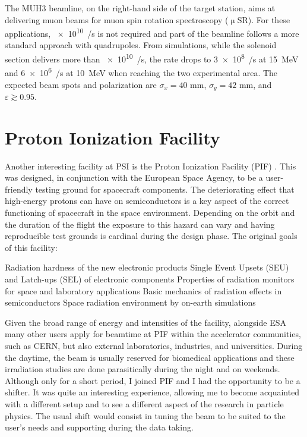 \begin{refsection}
        The MUH3 beamline, on the right-hand side of the target station, aims at delivering muon beams for muon spin rotation spectroscopy ($\upmu$SR).
        For these applications, \SI{e10}{\upmu/s} is not required and part of the beamline follows a more standard approach with quadrupoles.
        From simulations, while the solenoid section delivers more than \SI{e10}{\upmu/s}, the rate drops to \SI{3e8}{\upmu/s} at \SI{15}{MeV} and \SI{6e6}{\upmu/s} at \SI{10}{MeV} when reaching the two experimental area.
        The expected beam spots and polarization are $\sigma_x = 40$ mm, $\sigma_y = 42$ mm, and $\varepsilon\gtrsim 0.95$.
        
\section{Proton Ionization Facility}
    Another interesting facility at PSI is the Proton Ionization Facility (PIF) \cite{PIF:1996}\cite{PIF:2001}.
    This was designed, in conjunction with the European Space Agency, to be a user-friendly testing ground for spacecraft components.
    The deteriorating effect that high-energy protons can have on semiconductors is a key aspect of the correct functioning of spacecraft in the space environment.
    Depending on the orbit and the duration of the flight the exposure to this hazard can vary and having reproducible test grounds is cardinal during the design phase. 
    The original goals of this facility:
    \begin{outline}
        \1 Radiation hardness of the new electronic products
        \1 Single Event Upsets (SEU) and Latch-ups (SEL) of electronic components
        \1 Properties of radiation monitors for space and laboratory applications
        \1 Basic mechanics of radiation effects in semiconductors
        \1 Space radiation environment by on-earth simulations
    \end{outline}
    Given the broad range of energy and intensities of the facility, alongside ESA many other users apply for beamtime at PIF within the accelerator communities, such as CERN, but also external laboratories, industries, and universities.
    During the daytime, the beam is usually reserved for biomedical applications and these irradiation studies are done parasitically during the night and on weekends.
    Although only for a short period, I joined PIF and I had the opportunity to be a shifter. 
    It was quite an interesting experience, allowing me to become acquainted with a different setup and to see a different aspect of the research in particle physics.
    The usual shift would consist in tuning the beam to be suited to the user's needs and supporting during the data taking.

\printbibliography[
    heading = bibliographychapter,
    title=Bibliography for the introduction
]

\end{refsection}
